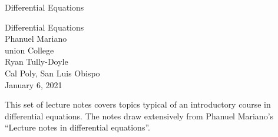 \documentclass[oneside,10pt,]{book}
\newcommand{\titlepagefont}{\relax}
\numberwithin{equation}{section}
\numberwithin{equation}{section}
\begin{document}
\frontmatter
\thispagestyle{empty}
{\titlepagefont\centering
\vspace*{0.28\textheight}
{\Huge Differential Equations}\\}
\clearpage
\thispagestyle{empty}
{\titlepagefont\centering
\vspace*{0.14\textheight}
{\Huge Differential Equations}\\[3\baselineskip]
{\Large Phanuel Mariano}\\[0.5\baselineskip]
{\Large union College}\\[3\baselineskip]
{\Large Ryan Tully-Doyle}\\[0.5\baselineskip]
{\Large Cal Poly, San Luis Obispo}\\[3\baselineskip]
{\Large January 6, 2021}\\}
\clearpage
\thispagestyle{empty}
\null\clearpage
This set of lecture notes covers topics typical of an introductory course in differential equations. The notes draw extensively from Phanuel Mariano's ``Lecture notes in differential equations''.%
\setcounter{tocdepth}{1}
\renewcommand*\contentsname{Contents}
\tableofcontents
\mainmatter
%
%
\typeout{************************************************}
\typeout{************************************************}
%
\end{document}
